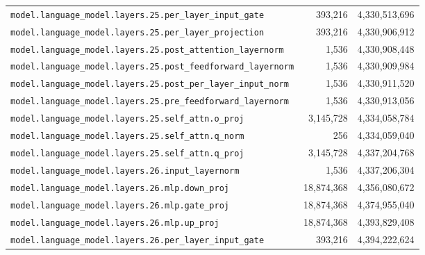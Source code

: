 \documentclass[10pt,a4paper]{article}
\theoremstyle{definition}
\begin{document}
\begin{appendices}
\begin{longtable}{p{9.5cm}rr}
\texttt{model.\allowbreak{}language\_model.\allowbreak{}layers.\allowbreak{}25.\allowbreak{}per\_layer\_input\_gate} & 393,216 & 4,330,513,696 \\
\texttt{model.\allowbreak{}language\_model.\allowbreak{}layers.\allowbreak{}25.\allowbreak{}per\_layer\_projection} & 393,216 & 4,330,906,912 \\
\texttt{model.\allowbreak{}language\_model.\allowbreak{}layers.\allowbreak{}25.\allowbreak{}post\_attention\_layernorm} & 1,536 & 4,330,908,448 \\
\texttt{model.\allowbreak{}language\_model.\allowbreak{}layers.\allowbreak{}25.\allowbreak{}post\_feedforward\_layernorm} & 1,536 & 4,330,909,984 \\
\texttt{model.\allowbreak{}language\_model.\allowbreak{}layers.\allowbreak{}25.\allowbreak{}post\_per\_layer\_input\_norm} & 1,536 & 4,330,911,520 \\
\texttt{model.\allowbreak{}language\_model.\allowbreak{}layers.\allowbreak{}25.\allowbreak{}pre\_feedforward\_layernorm} & 1,536 & 4,330,913,056 \\
\texttt{model.\allowbreak{}language\_model.\allowbreak{}layers.\allowbreak{}25.\allowbreak{}self\_attn.\allowbreak{}o\_proj} & 3,145,728 & 4,334,058,784 \\
\texttt{model.\allowbreak{}language\_model.\allowbreak{}layers.\allowbreak{}25.\allowbreak{}self\_attn.\allowbreak{}q\_norm} & 256 & 4,334,059,040 \\
\texttt{model.\allowbreak{}language\_model.\allowbreak{}layers.\allowbreak{}25.\allowbreak{}self\_attn.\allowbreak{}q\_proj} & 3,145,728 & 4,337,204,768 \\
\texttt{model.\allowbreak{}language\_model.\allowbreak{}layers.\allowbreak{}26.\allowbreak{}input\_layernorm} & 1,536 & 4,337,206,304 \\
\texttt{model.\allowbreak{}language\_model.\allowbreak{}layers.\allowbreak{}26.\allowbreak{}mlp.\allowbreak{}down\_proj} & 18,874,368 & 4,356,080,672 \\
\texttt{model.\allowbreak{}language\_model.\allowbreak{}layers.\allowbreak{}26.\allowbreak{}mlp.\allowbreak{}gate\_proj} & 18,874,368 & 4,374,955,040 \\
\texttt{model.\allowbreak{}language\_model.\allowbreak{}layers.\allowbreak{}26.\allowbreak{}mlp.\allowbreak{}up\_proj} & 18,874,368 & 4,393,829,408 \\
\texttt{model.\allowbreak{}language\_model.\allowbreak{}layers.\allowbreak{}26.\allowbreak{}per\_layer\_input\_gate} & 393,216 & 4,394,222,624 \\

\end{longtable}
\end{appendices}
\end{document}
